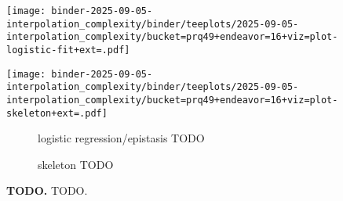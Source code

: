 \begin{figure}

\begin{minipage}{\linewidth}
\centering
\begin{minipage}{0.38\linewidth}
\texttt{[image: binder-2025-09-05-interpolation\_complexity/binder/teeplots/2025-09-05-interpolation\_complexity/bucket=prq49+endeavor=16+viz=plot-logistic-fit+ext=.pdf]}
\end{minipage}
\begin{minipage}{0.58\linewidth}
\texttt{[image: binder-2025-09-05-interpolation\_complexity/binder/teeplots/2025-09-05-interpolation\_complexity/bucket=prq49+endeavor=16+viz=plot-skeleton+ext=.pdf]}
\end{minipage}
\end{minipage}

\vspace{-1ex}

\begin{minipage}{\linewidth}
\centering
\begin{subfigure}[t]{0.38\linewidth}
\caption{\footnotesize logistic regression/epistasis TODO}
\end{subfigure}
\begin{subfigure}[t]{0.58\linewidth}
\caption{\footnotesize skeleton TODO}
\end{subfigure}
\end{minipage}

\caption{
\textbf{TODO.}
TODO.
}
\label{fig:cryptic}

\end{figure}

